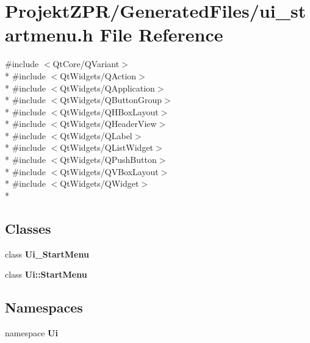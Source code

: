 \section{Projekt\-Z\-P\-R/\-Generated\-Files/ui\-\_\-startmenu.h File Reference}
\label{ui__startmenu_8h}
{\ttfamily \#include $<$Qt\-Core/\-Q\-Variant$>$}\\*
{\ttfamily \#include $<$Qt\-Widgets/\-Q\-Action$>$}\\*
{\ttfamily \#include $<$Qt\-Widgets/\-Q\-Application$>$}\\*
{\ttfamily \#include $<$Qt\-Widgets/\-Q\-Button\-Group$>$}\\*
{\ttfamily \#include $<$Qt\-Widgets/\-Q\-H\-Box\-Layout$>$}\\*
{\ttfamily \#include $<$Qt\-Widgets/\-Q\-Header\-View$>$}\\*
{\ttfamily \#include $<$Qt\-Widgets/\-Q\-Label$>$}\\*
{\ttfamily \#include $<$Qt\-Widgets/\-Q\-List\-Widget$>$}\\*
{\ttfamily \#include $<$Qt\-Widgets/\-Q\-Push\-Button$>$}\\*
{\ttfamily \#include $<$Qt\-Widgets/\-Q\-V\-Box\-Layout$>$}\\*
{\ttfamily \#include $<$Qt\-Widgets/\-Q\-Widget$>$}\\*
\subsection*{Classes}
\begin{DoxyCompactItemize}
\item 
class {\bf Ui\-\_\-\-Start\-Menu}
\item 
class {\bf Ui\-::\-Start\-Menu}
\end{DoxyCompactItemize}
\subsection*{Namespaces}
\begin{DoxyCompactItemize}
\item 
namespace {\bf Ui}
\end{DoxyCompactItemize}

